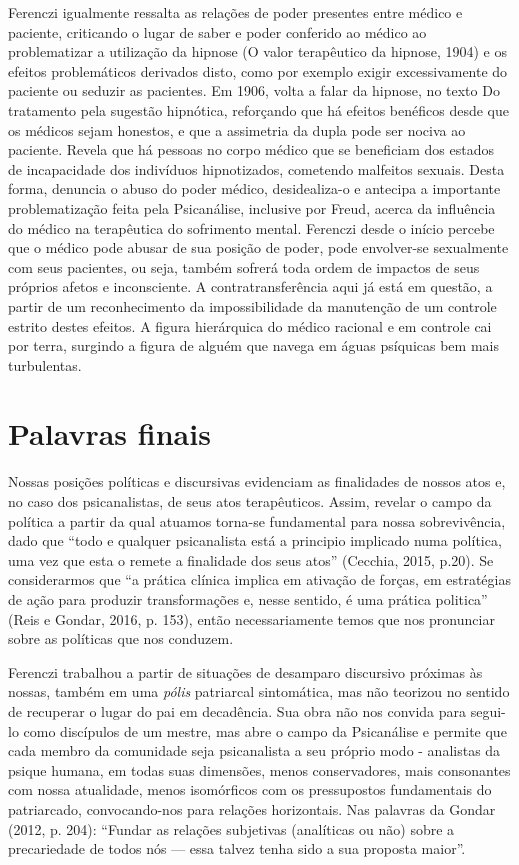 Ferenczi igualmente ressalta as relações de poder presentes entre médico
e paciente, criticando o lugar de saber e poder conferido ao médico ao
problematizar a utilização da hipnose (O valor terapêutico da hipnose,
1904) e os efeitos problemáticos derivados disto, como por exemplo
exigir excessivamente do paciente ou seduzir as pacientes. Em 1906,
volta a falar da hipnose, no texto Do tratamento pela sugestão
hipnótica, reforçando que há efeitos benéficos desde que os médicos
sejam honestos, e que a assimetria da dupla pode ser nociva ao paciente.
Revela que há pessoas no corpo médico que se beneficiam dos estados de
incapacidade dos indivíduos hipnotizados, cometendo malfeitos sexuais.
Desta forma, denuncia o abuso do poder médico, desidealiza-o e antecipa
a importante problematização feita pela Psicanálise, inclusive por
Freud, acerca da influência do médico na terapêutica do sofrimento
mental. Ferenczi desde o início percebe que o médico pode abusar de sua
posição de poder, pode envolver-se sexualmente com seus pacientes, ou
seja, também sofrerá toda ordem de impactos de seus próprios afetos e
inconsciente. A contratransferência aqui já está em questão, a partir de
um reconhecimento da impossibilidade da manutenção de um controle
estrito destes efeitos. A figura hierárquica do médico racional e em
controle cai por terra, surgindo a figura de alguém que navega em águas
psíquicas bem mais turbulentas.

\section{Palavras finais}

Nossas posições políticas e discursivas evidenciam as finalidades de
nossos atos e, no caso dos psicanalistas, de seus atos terapêuticos.
Assim, revelar o campo da política a partir da qual atuamos torna-se
fundamental para nossa sobrevivência, dado que ``todo e qualquer
psicanalista está a principio implicado numa política, uma vez que esta
o remete a finalidade dos seus atos'' (Cecchia, 2015, p.20). Se
considerarmos que ``a prática clínica implica em ativação de forças, em
estratégias de ação para produzir transformações e, nesse sentido, é uma
prática politica'' (Reis e Gondar, 2016, p. 153), então necessariamente
temos que nos pronunciar sobre as políticas que nos conduzem.

Ferenczi trabalhou a partir de situações de desamparo discursivo
próximas às nossas, também em uma \emph{pólis} patriarcal sintomática,
mas não teorizou no sentido de recuperar o lugar do pai em decadência.
Sua obra não nos convida para segui-lo como discípulos de um mestre, mas
abre o campo da Psicanálise e permite que cada membro da comunidade seja
psicanalista a seu próprio modo - analistas da psique humana, em todas
suas dimensões, menos conservadores, mais consonantes com nossa
atualidade, menos isomórficos com os pressupostos fundamentais do
patriarcado, convocando-nos para relações horizontais. Nas palavras da
Gondar (2012, p. 204): ``Fundar as relações subjetivas (analíticas ou
não) sobre a precariedade de todos nós --- essa talvez tenha sido a sua
proposta maior''.

